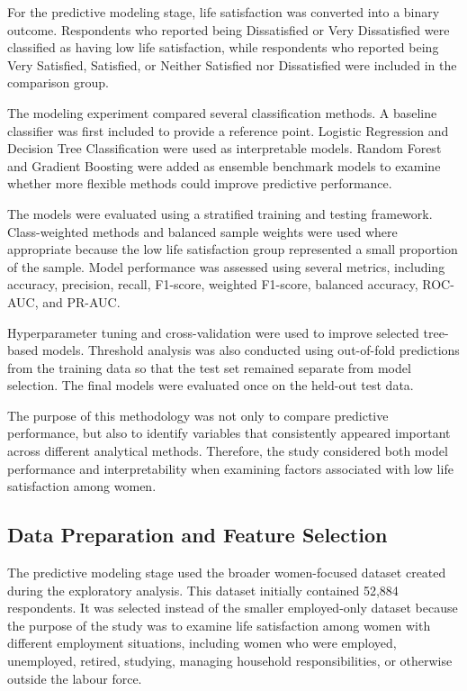 \documentclass[12pt]{article}
\begin{document}
For the predictive modeling stage, life satisfaction was converted into a binary outcome. Respondents who reported being Dissatisfied or Very Dissatisfied were classified as having low life satisfaction, while respondents who reported being Very Satisfied, Satisfied, or Neither Satisfied nor Dissatisfied were included in the comparison group.

The modeling experiment compared several classification methods. A baseline classifier was first included to provide a reference point. Logistic Regression and Decision Tree Classification were used as interpretable models. Random Forest and Gradient Boosting were added as ensemble benchmark models to examine whether more flexible methods could improve predictive performance.

The models were evaluated using a stratified training and testing framework. Class-weighted methods and balanced sample weights were used where appropriate because the low life satisfaction group represented a small proportion of the sample. Model performance was assessed using several metrics, including accuracy, precision, recall, F1-score, weighted F1-score, balanced accuracy, ROC-AUC, and PR-AUC.

Hyperparameter tuning and cross-validation were used to improve selected tree-based models. Threshold analysis was also conducted using out-of-fold predictions from the training data so that the test set remained separate from model selection. The final models were evaluated once on the held-out test data.

The purpose of this methodology was not only to compare predictive performance, but also to identify variables that consistently appeared important across different analytical methods. Therefore, the study considered both model performance and interpretability when examining factors associated with low life satisfaction among women.

\subsection{Data Preparation and Feature Selection}

The predictive modeling stage used the broader women-focused dataset created during the exploratory analysis. This dataset initially contained 52,884 respondents. It was selected instead of the smaller employed-only dataset because the purpose of the study was to examine life satisfaction among women with different employment situations, including women who were employed, unemployed, retired, studying, managing household responsibilities, or otherwise outside the labour force.
\end{document}
